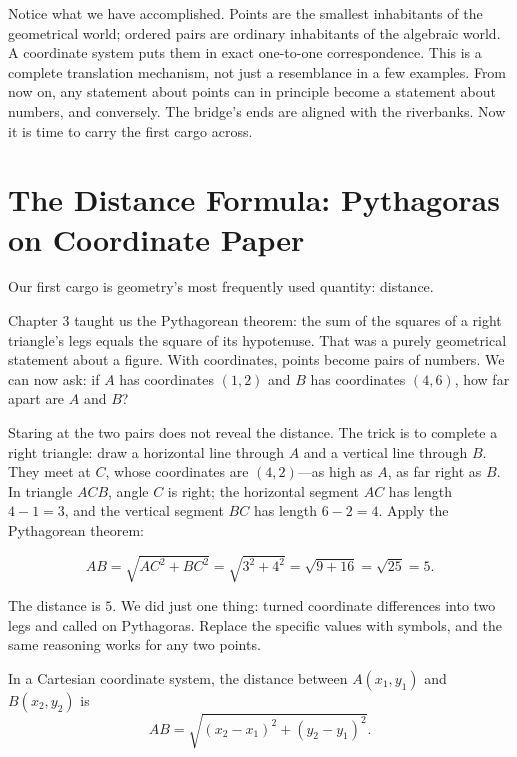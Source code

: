 Notice what we have accomplished. Points are the smallest inhabitants of the geometrical world; ordered pairs are ordinary inhabitants of the algebraic world. A coordinate system puts them in exact one-to-one correspondence. This is a complete translation mechanism, not just a resemblance in a few examples. From now on, any statement about points can in principle become a statement about numbers, and conversely. The bridge's ends are aligned with the riverbanks. Now it is time to carry the first cargo across.

\section{The Distance Formula: Pythagoras on Coordinate Paper}

Our first cargo is geometry's most frequently used quantity: distance.

Chapter 3 taught us the Pythagorean theorem: the sum of the squares of a right triangle's legs equals the square of its hypotenuse. That was a purely geometrical statement about a figure. With coordinates, points become pairs of numbers. We can now ask: if $A$ has coordinates $(1,2)$ and $B$ has coordinates $(4,6)$, how far apart are $A$ and $B$?

Staring at the two pairs does not reveal the distance. The trick is to complete a right triangle: draw a horizontal line through $A$ and a vertical line through $B$. They meet at $C$, whose coordinates are $(4,2)$---as high as $A$, as far right as $B$. In triangle $ACB$, angle $C$ is right; the horizontal segment $AC$ has length $4-1=3$, and the vertical segment $BC$ has length $6-2=4$. Apply the Pythagorean theorem:

\[
AB=\sqrt{AC^{2}+BC^{2}}=\sqrt{3^{2}+4^{2}}=\sqrt{9+16}=\sqrt{25}=5.
\]

The distance is $5$. We did just one thing: turned coordinate differences into two legs and called on Pythagoras. Replace the specific values with symbols, and the same reasoning works for any two points.

\begin{dingli}
In a Cartesian coordinate system, the distance between $A(x_{1},y_{1})$ and $B(x_{2},y_{2})$ is
\[
AB=\sqrt{(x_{2}-x_{1})^{2}+(y_{2}-y_{1})^{2}}.
\]
\end{dingli}

